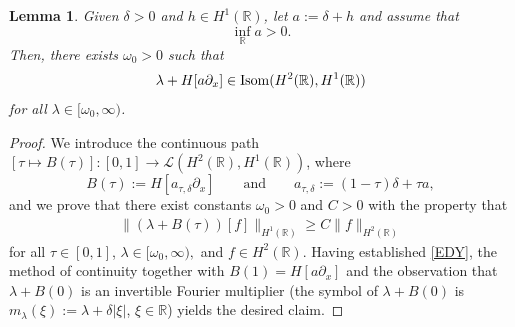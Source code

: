 \documentclass[11pt,reqno]{amsart}
\numberwithin{equation}{section}
\newcommand{\0}{\Omega}
\newcommand{\p}{\partial}
\newcommand{\kL}{\mathcal{L}}
\newcommand{\R}{\mathbb{R}}
\newtheorem{lemma}[thm]{Lemma}
\numberwithin{equation}{section}
\begin{document}
\begin{lemma}\label{L:Isom}
Given $\delta>0$ and $h\in H^1(\R)$, let $a:=\delta+h $ and assume that  
\[\inf_\R a>0.\] 
Then, there exists $\omega_0>0$ such that  
\begin{align*}
 \lambda+H[ a\p_x]\in{\rm Isom }(H^2(\R),H^1(\R))
 \end{align*}
  for all $\lambda\in[\omega_0,\infty)$.
\end{lemma}
\begin{proof} 
We introduce the continuous path $[\tau\mapsto B(\tau)]:[0,1]\to \kL(H^2(\R), H^1(\R))$, where
\[
B(\tau):=  H[ a_{\tau,\delta}\p_x]\qquad \text{and}\qquad a_{\tau,\delta}:=(1-\tau)\delta+\tau a,
\]
 and we prove that there exist constants $\omega_0>0$ and  $C>0$ with the property that 
 \begin{align}\label{EDY}
  \|(\lambda+B(\tau))[f]\|_{ H^1(\R)}\geq C\|f\|_{H^2(\R)}
 \end{align}
 for all $\tau\in[0,1]$, $\lambda\in[\omega_0,\infty),$ and $f\in H^2(\R)$.
Having established \eqref{EDY},   the method of continuity  together with  $B(1)= H[ a\p_x]$  and the observation that  $\lambda+B(0)$ is an invertible Fourier multiplier (the symbol of
$\lambda+B(0)$ is $m_\lambda(\xi):= \lambda+\delta |\xi|$, $\xi \in\R$) yields the desired claim.


\end{proof}
\end{document}
